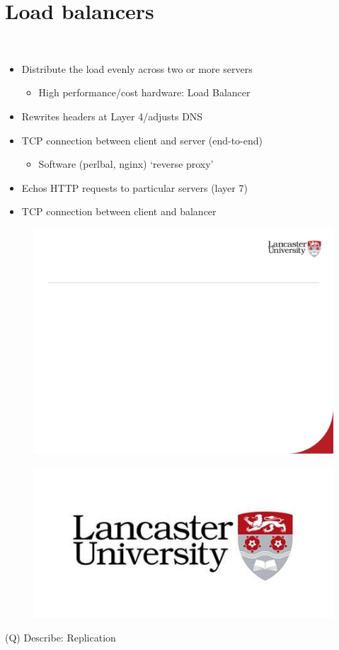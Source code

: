 \documentclass[12pt]{article}
\begin{document}
\section{Load balancers}
\\
\begin{itemize}
  \item Distribute the load evenly across two or more servers
\begin{itemize}
  \item High performance/cost hardware: Load Balancer
\end{itemize}
  \item Rewrites headers at Layer 4/adjusts DNS
  \item TCP connection between client and server (end-to-end)
\begin{itemize}
  \item Software (perlbal, nginx) ‘reverse proxy’
\end{itemize}
  \item Echos HTTP requests to particular servers (layer 7)
  \item TCP connection between client and balancer
\end{itemize}
\begin{figure}[H]
\includegraphics[width=0.5\linewidth]{page74-image-1.png}
\end{figure}
\begin{figure}[H]
\includegraphics[width=0.5\linewidth]{page74-image-2.png}
\end{figure}
\clearpage
(Q)
Describe: Replication
\clearpage
\end{document}
